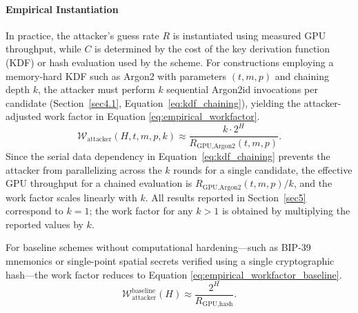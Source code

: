 \documentclass[mathematics,article,accept,pdftex,moreauthors]{Definitions/mdpi}
\begin{document}
\paragraph*{Empirical Instantiation}
In practice, the attacker’s guess rate $R$ is instantiated using measured GPU throughput, while $C$ is determined by the cost of the key derivation function (KDF) or hash evaluation used by the scheme. For constructions employing a memory-hard KDF such as Argon2 with parameters $(t, m, p)$ and chaining depth $k$, the attacker must perform $k$ sequential Argon2id invocations per candidate (Section~\ref{sec4.1}, Equation~\eqref{eq:kdf_chaining}), yielding the attacker-adjusted work factor in Equation \eqref{eq:empirical_workfactor}.
\begin{equation}
\mathcal{W}_{\text{attacker}}(H, t, m, p, k) \approx \frac{k \cdot 2^{H}}{R_{\text{GPU,Argon2}}(t, m, p)}.
\label{eq:empirical_workfactor}
\end{equation}
{Since the serial data dependency in Equation~\eqref{eq:kdf_chaining} prevents the attacker from parallelizing across the $k$ rounds for a single candidate, the effective GPU throughput for a chained evaluation is $R_{\text{GPU,Argon2}}(t,m,p)/k$, and the work factor scales linearly with $k$. All results reported in Section~\ref{sec5} correspond to $k=1$; the work factor for any $k > 1$ is obtained by multiplying the reported values by $k$.}

For baseline schemes without computational hardening—such as BIP-39 mnemonics or single-point spatial secrets verified using a single cryptographic hash—the work factor reduces to Equation \eqref{eq:empirical_workfactor_baseline}.
\begin{equation}
\mathcal{W}_{\text{attacker}}^{\text{baseline}}(H) \approx \frac{2^{H}}{R_{\text{GPU,hash}}}.
\label{eq:empirical_workfactor_baseline}
\end{equation}
\end{document}
